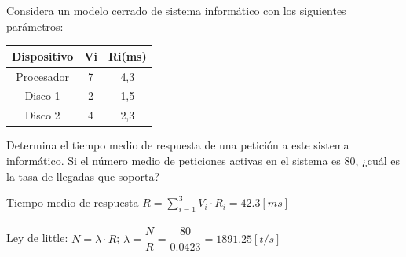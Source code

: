 Considera un modelo cerrado de sistema informático con los siguientes parámetros:
\begin{table}[H]\centering
\begin{tabular}{|c|c|c|}
\hline
\textbf{Dispositivo} & \textbf{Vi} & \textbf{Ri(ms)} \\ \hline
Procesador  & 7  & 4,3    \\ \hline
Disco 1     & 2  & 1,5    \\ \hline
Disco 2     & 4  & 2,3    \\ \hline
\end{tabular}
\end{table}
Determina el tiempo medio de respuesta de una petición a este sistema informático. Si el número medio de peticiones activas en el sistema es 80, ¿cuál es la tasa de llegadas que soporta?
\begin{tcolorbox}[colback=white,colframe=cyan!50!black,fonttitle=\bfseries]
Tiempo medio de respuesta $R=\sum_{i=1}^{3}V_i\cdot R_i=42.3[ms]$\\\\
Ley de little: $N = \lambda \cdot R$; $\lambda = \dfrac{N}{R}=\dfrac{80}{0.0423}=1891.25[t/s]$
\end{tcolorbox}
